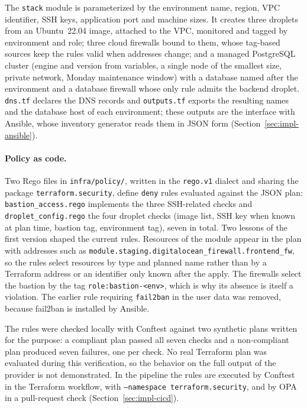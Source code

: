 The \texttt{stack} module is parameterized by the environment name, region, VPC identifier, SSH keys, application port and machine sizes. It creates three droplets from an Ubuntu~22.04 image, attached to the VPC, monitored and tagged by environment and role; three cloud firewalls bound to them, whose tag-based sources keep the rules valid when addresses change; and a managed PostgreSQL cluster (engine and version from variables, a single node of the smallest size, private network, Monday maintenance window) with a database named after the environment and a database firewall whose only rule admits the backend droplet. \texttt{dns.tf} declares the DNS records and \texttt{outputs.tf} exports the resulting names and the database host of each environment; these outputs are the interface with Ansible, whose inventory generator reads them in JSON form (Section~\ref{sec:impl-ansible}).

\paragraph{Policy as code.} Two Rego files in \texttt{infra/policy/}, written in the \texttt{rego.v1} dialect and sharing the package \texttt{terraform.security}, define \texttt{deny} rules evaluated against the JSON plan: \texttt{bastion\_access.rego} implements the three SSH-related checks and \texttt{droplet\_config.rego} the four droplet checks (image list, SSH key when known at plan time, bastion tag, environment tag), seven in total. Two lessons of the first version shaped the current rules. Resources of the module appear in the plan with addresses such as \texttt{module.staging.digitalocean\_firewall.frontend\_fw}, so the rules select resources by type and planned name rather than by a Terraform address or an identifier only known after the apply. The firewalls select the bastion by the tag \texttt{role:bastion-<env>}, which is why its absence is itself a violation. The earlier rule requiring \texttt{fail2ban} in the user data was removed, because fail2ban is installed by Ansible.

The rules were checked locally with Conftest against two synthetic plans written for the purpose: a compliant plan passed all seven checks and a non-compliant plan produced seven failures, one per check. No real Terraform plan was evaluated during this verification, so the behavior on the full output of the provider is not demonstrated. In the pipeline the rules are executed by Conftest in the Terraform workflow, with \texttt{--namespace terraform.security}, and by OPA in a pull-request check (Section~\ref{sec:impl-cicd}).

